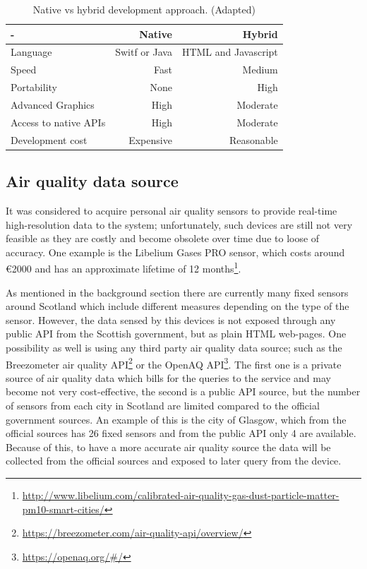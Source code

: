 \begin{table}[ht]
\centering
\begin{adjustbox}{width=.6\textwidth,center=\textwidth}
\begin{tabular}{lrr}
  \hline
   - & Native & Hybrid  \\ \hline
   Language & Switf or Java & HTML and Javascript \\
   Speed & Fast & Medium \\
   Portability & None & High \\
   Advanced Graphics & High & Moderate \\
   Access to native APIs & High & Moderate \\
   Development cost & Expensive & Reasonable \\
   \hline
\end{tabular}
\end{adjustbox}
  \caption[Native vs hybrid development approach ]{Native vs hybrid development approach. (Adapted) \footnotemark }
\label{tab:development_approaches}
\end{table} 

\subsection{Air quality data source}
It was considered to acquire personal air quality sensors to provide real-time high-resolution data to the system; unfortunately, such devices are still not very feasible as they are costly and become obsolete over time due to loose of accuracy. One example is the Libelium Gases PRO sensor, which costs around \euro{}2000 and has an approximate lifetime of 12 months\footnote{\url{http://www.libelium.com/calibrated-air-quality-gas-dust-particle-matter-pm10-smart-cities/}}. 

As mentioned in the background section there are currently many fixed sensors around Scotland which include different measures depending on the type of the sensor. However, the data sensed by this devices is not exposed through any public API from the Scottish government, but as plain HTML web-pages. One possibility as well is using any third party air quality data source; such as the Breezometer air quality API\footnote{\url{https://breezometer.com/air-quality-api/overview/}} or the OpenAQ API\footnote{\url{https://openaq.org/#/}}. The first one is a private source of air quality data which bills for the queries to the service and may become not very cost-effective, the second is a public API source, but the number of sensors from each city in Scotland are limited compared to the official government sources. An example of this is the city of Glasgow, which from the official sources has 26 fixed sensors and from the public API only 4 are available. Because of this, to have a more accurate air quality source the data will be collected from the official sources and exposed to later query from the device. 

